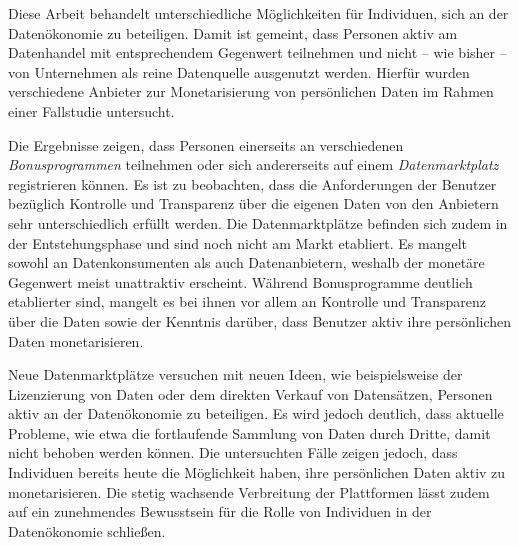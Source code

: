 Diese Arbeit behandelt unterschiedliche Möglichkeiten für Individuen, sich an der Datenökonomie zu beteiligen. Damit ist gemeint, dass Personen aktiv am Datenhandel mit entsprechendem Gegenwert teilnehmen und nicht -- wie bisher -- von Unternehmen als reine Datenquelle ausgenutzt werden. Hierfür wurden verschiedene Anbieter zur Monetarisierung von persönlichen Daten im Rahmen einer Fallstudie untersucht. \newline

\noindent Die Ergebnisse zeigen, dass Personen einerseits an verschiedenen \textit{Bonusprogrammen} teilnehmen oder sich andererseits auf einem \textit{Datenmarktplatz} registrieren können. Es ist zu beobachten, dass die Anforderungen der Benutzer bezüglich Kontrolle und Transparenz über die eigenen Daten von den Anbietern sehr unterschiedlich erfüllt werden. Die Datenmarktplätze befinden sich zudem in der Entstehungsphase und sind noch nicht am Markt etabliert. Es mangelt sowohl an Datenkonsumenten als auch Datenanbietern, weshalb der monetäre Gegenwert meist unattraktiv erscheint. Während Bonusprogramme deutlich etablierter sind, mangelt es bei ihnen vor allem an Kontrolle und Transparenz über die Daten sowie der Kenntnis darüber, dass Benutzer aktiv ihre persönlichen Daten monetarisieren. \newline

\noindent Neue Datenmarktplätze versuchen mit neuen Ideen, wie beispielsweise der Lizenzierung von Daten oder dem direkten Verkauf von Datensätzen, Personen aktiv an der Datenökonomie zu beteiligen. Es wird jedoch deutlich, dass aktuelle Probleme, wie etwa die fortlaufende Sammlung von Daten durch Dritte, damit nicht behoben werden können. Die untersuchten Fälle zeigen jedoch, dass Individuen bereits heute die Möglichkeit haben, ihre persönlichen Daten aktiv zu monetarisieren. Die stetig wachsende Verbreitung der Plattformen lässt zudem auf ein zunehmendes Bewusstsein für die Rolle von Individuen in der Datenökonomie schließen.